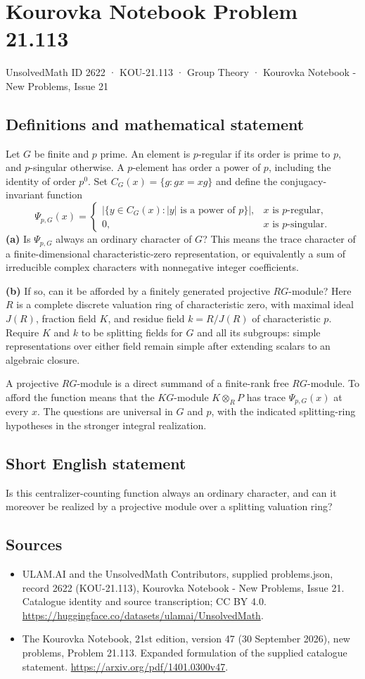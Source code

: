 \documentclass[11pt,a4paper]{article}
\begin{document}
\section*{Kourovka Notebook Problem 21.113}\label{2622}
{\small UnsolvedMath ID 2622 · KOU-21.113 · Group Theory · Kourovka Notebook - New Problems, Issue 21}
\subsection{Definitions and mathematical statement}
Let $G$ be finite and $p$ prime. An element is $p$-regular if its order is prime to $p$, and $p$-singular otherwise. A $p$-element has order a power of $p$, including the identity of order $p^0$. Set $C_G(x)=\{g:gx=xg\}$ and define the conjugacy-invariant function
\[
 \Psi_{p,G}(x)=
 \begin{cases}
 |\{y\in C_G(x):|y|\text{ is a power of }p\}|,
       &x\text{ is }p\text{-regular},\\
 0,&x\text{ is }p\text{-singular}.
 \end{cases}
\]
\textbf{(a)} Is $\Psi_{p,G}$ always an ordinary character of $G$? This means the trace character of a finite-dimensional characteristic-zero representation, or equivalently a sum of irreducible complex characters with nonnegative integer coefficients.

\textbf{(b)} If so, can it be afforded by a finitely generated projective $RG$-module? Here $R$ is a complete discrete valuation ring of characteristic zero, with maximal ideal $J(R)$, fraction field $K$, and residue field $k=R/J(R)$ of characteristic $p$. Require $K$ and $k$ to be splitting fields for $G$ and all its subgroups: simple representations over either field remain simple after extending scalars to an algebraic closure.

A projective $RG$-module is a direct summand of a finite-rank free $RG$-module. To afford the function means that the $KG$-module $K\otimes_R P$ has trace $\Psi_{p,G}(x)$ at every $x$. The questions are universal in $G$ and $p$, with the indicated splitting-ring hypotheses in the stronger integral realization.
\subsection{Short English statement}
Is this centralizer-counting function always an ordinary character, and can it moreover be realized by a projective module over a splitting valuation ring?
\subsection{Sources}
\begin{itemize}
\item[S1] ULAM.AI and the UnsolvedMath Contributors, supplied problems.json, record 2622 (KOU-21.113), Kourovka Notebook - New Problems, Issue 21. Catalogue identity and source transcription; CC BY 4.0.
\url{https://huggingface.co/datasets/ulamai/UnsolvedMath}.
\item[S2] The Kourovka Notebook, 21st edition, version 47 (30 September 2026), new problems, Problem 21.113. Expanded formulation of the supplied catalogue statement.
\url{https://arxiv.org/pdf/1401.0300v47}.
\end{itemize}
\end{document}
